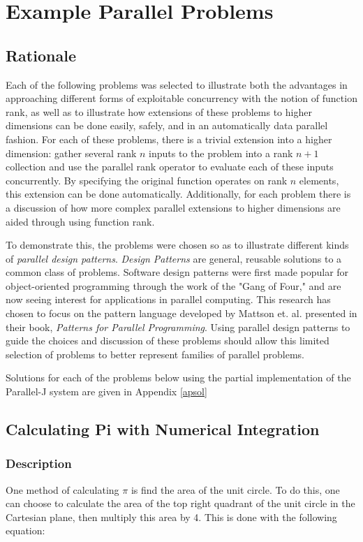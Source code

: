 \chapter{Example Parallel Problems}
\label{probs}

\section{Rationale}
Each of the following problems was selected to illustrate 
both the advantages in approaching different forms of exploitable concurrency with the notion of function rank, 
as well as to illustrate how extensions of these problems to higher dimensions can be done easily, safely, 
and in an automatically data parallel fashion.
For each of these problems, there is a trivial extension into a higher dimension: 
gather several rank $n$ inputs to the problem into a rank $n+1$ collection 
and use the parallel rank operator to evaluate each of these inputs concurrently.
By specifying the original function operates on rank $n$ elements, 
this extension can be done automatically.
Additionally, for each problem there is a discussion 
of how more complex parallel extensions to higher dimensions are aided through using function rank. 

To demonstrate this, the problems were chosen so as to illustrate different kinds of \textit{parallel design patterns}. 
\textit{Design Patterns} are general, reusable solutions to a common class of problems. %
Software design patterns were first made popular for object-oriented programming through the work of the "Gang of Four,"\cite{designp} 
and are now seeing interest for applications in parallel computing. \cite{mass} 
This research has chosen to focus on the pattern language developed by Mattson et. al. \cite{mass}
presented in their book, \textit{Patterns for Parallel Programming}. %
Using parallel design patterns to guide the choices and discussion of these problems 
should allow this limited selection of problems to better represent families of parallel problems.

Solutions for each of the problems below using the partial implementation of the Parallel-J system
are given in Appendix \ref{apsol}

\section{Calculating Pi with Numerical Integration}
\subsection{Description}
One method of calculating $\pi$ is find the area of the unit circle. 
To do this, one can choose to calculate the area of the top right quadrant of the unit circle in the Cartesian plane, 
then multiply this area by 4. 
This is done with the following equation:

